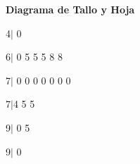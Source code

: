 \documentclass{oxmathproblems}
\begin{document}
\begin{questions}
\begin{itemize}
\end{itemize}

\miquestion \textbf { Diagrama de Tallo y Hoja} 

4$\mid$ 0 

6$\mid$ 0 5 5 5 8 8 

7$\mid$ 0 0 0 0 0 0 0 

7$\mid$4  5 5 

9$\mid$ 0 5 

 9$\mid$ 0 




\end{questions}
\end{document}

